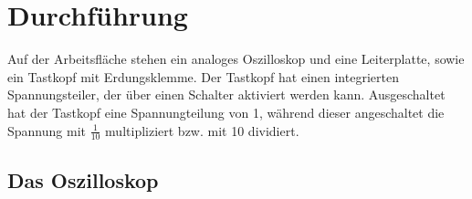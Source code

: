 \section{Durchführung}
\label{sec:Durchführung}

Auf der Arbeitsfläche stehen ein analoges Oszilloskop und eine Leiterplatte, sowie ein Tastkopf mit Erdungsklemme. Der Tastkopf hat einen integrierten Spannungsteiler, der über einen Schalter aktiviert werden kann. Ausgeschaltet hat der Tastkopf eine Spannungteilung von 1, während dieser angeschaltet die Spannung mit $\frac{1}{10}$ multipliziert bzw. mit 10 dividiert.

\subsection{Das Oszilloskop}

